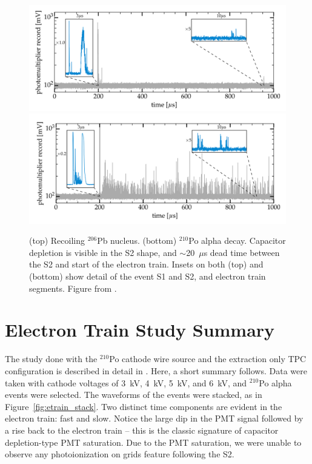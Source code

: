\begin{figure}[htbp]
\begin{center}
\includegraphics[width=\textwidth]{figures/etrains/event_pb_recoil.png}
\includegraphics[width=\textwidth]{figures/etrains/event_po_alpha.png}
\caption{ (top) Recoiling $^{206}$Pb nucleus. (bottom)  $^{210}$Po alpha decay. Capacitor depletion is visible in the S2 shape, and $\sim$20~$\mu$s dead time between the S2 and start of the electron train. Insets on both (top) and (bottom) show detail of the event S1 and S2, and electron train segments. Figure from \cite{SorensenKamdin2018}. }
\label{fig:po_pbrecoil_examples}
\end{center}
\end{figure}


\section{Electron Train Study Summary}
The study done with the $^{210}$Po cathode wire source and the extraction only \ac{TPC} configuration is described in detail in \cite{SorensenKamdin2018}. Here, a short summary follows. Data were taken with cathode voltages of 3~kV, 4~kV, 5~kV, and 6~kV, and $^{210}$Po alpha events were selected. The waveforms of the events were stacked, as in Figure~\ref{fig:etrain_stack}. Two distinct time components are evident in the electron train: fast and slow. Notice the large dip in the \ac{PMT} signal followed by a rise back to the electron train -- this is the classic signature of capacitor depletion-type \ac{PMT} saturation. Due to the \ac{PMT} saturation, we were unable to observe any photoionization on grids feature following the S2.

